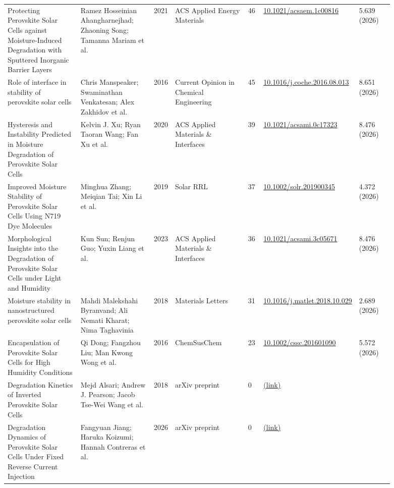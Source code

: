 \documentclass[10pt,a4paper]{article}
\begin{document}
{\begin{longtable}{p{0.197\linewidth}p{0.197\linewidth}p{0.043\linewidth}p{0.197\linewidth}p{0.043\linewidth}p{0.117\linewidth}p{0.098\linewidth}}
Protecting Perovskite Solar Cells against Moisture-Induced Degradation with Sputtered Inorganic Barrier Layers & Ramez Hosseinian Ahangharnejhad; Zhaoning Song; Tamanna Mariam et al. & 2021 & ACS Applied Energy Materials & 46 & \href{https://doi.org/10.1021/acsaem.1c00816}{10.1021/acsaem.1c00816} & 5.639 (2026) \\
Role of interface in stability of perovskite solar cells & Chris Manspeaker; Swaminathan Venkatesan; Alex Zakhidov et al. & 2016 & Current Opinion in Chemical Engineering & 45 & \href{https://doi.org/10.1016/j.coche.2016.08.013}{10.1016/j.coche.2016.08.013} & 8.651 (2026) \\
Hysteresis and Instability Predicted in Moisture Degradation of Perovskite Solar Cells & Kelvin J. Xu; Ryan Taoran Wang; Fan Xu et al. & 2020 & ACS Applied Materials \& Interfaces & 39 & \href{https://doi.org/10.1021/acsami.0c17323}{10.1021/acsami.0c17323} & 8.476 (2026) \\
Improved Moisture Stability of Perovskite Solar Cells Using N719 Dye Molecules & Minghua Zhang; Meiqian Tai; Xin Li et al. & 2019 & Solar RRL & 37 & \href{https://doi.org/10.1002/solr.201900345}{10.1002/solr.201900345} & 4.372 (2026) \\
Morphological Insights into the Degradation of Perovskite Solar Cells under Light and Humidity & Kun Sun; Renjun Guo; Yuxin Liang et al. & 2023 & ACS Applied Materials \& Interfaces & 36 & \href{https://doi.org/10.1021/acsami.3c05671}{10.1021/acsami.3c05671} & 8.476 (2026) \\
Moisture stability in nanostructured perovskite solar cells & Mahdi Malekshahi Byranvand; Ali Nemati Kharat; Nima Taghavinia & 2018 & Materials Letters & 31 & \href{https://doi.org/10.1016/j.matlet.2018.10.029}{10.1016/j.matlet.2018.10.029} & 2.689 (2026) \\
Encapsulation of Perovskite Solar Cells for High Humidity Conditions & Qi Dong; Fangzhou Liu; Man Kwong Wong et al. & 2016 & ChemSusChem & 23 & \href{https://doi.org/10.1002/cssc.201601090}{10.1002/cssc.201601090} & 5.572 (2026) \\
Degradation Kinetics of Inverted Perovskite Solar Cells & Mejd Alsari; Andrew J. Pearson; Jacob Tse-Wei Wang et al. & 2018 & arXiv preprint & 0 & \href{http://arxiv.org/abs/1801.09761v1}{(link)} &  \\
Degradation Dynamics of Perovskite Solar Cells Under Fixed Reverse Current Injection & Fangyuan Jiang; Haruka Koizumi; Hannah Contreras et al. & 2026 & arXiv preprint & 0 & \href{http://arxiv.org/abs/2603.20516v1}{(link)} &  \\

\end{longtable}}
\end{document}
